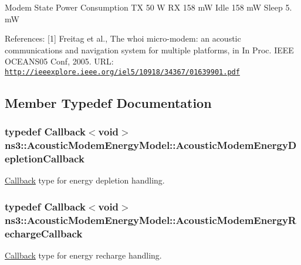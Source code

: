 Modem State Power Consumption TX 50 W RX 158 mW Idle 158 mW Sleep 5. mW

References\+: \mbox{[}1\mbox{]} Freitag et al., The whoi micro-\/modem\+: an acoustic communications and navigation system for multiple platforms, in In Proc. I\+E\+EE O\+C\+E\+A\+N\+S05 Conf, 2005. U\+RL\+: \href{http://ieeexplore.ieee.org/iel5/10918/34367/01639901.pdf}{\tt http\+://ieeexplore.\+ieee.\+org/iel5/10918/34367/01639901.\+pdf} 

\subsection{Member Typedef Documentation}
\subsubsection[{\texorpdfstring{Acoustic\+Modem\+Energy\+Depletion\+Callback}{AcousticModemEnergyDepletionCallback}}]{\setlength{\rightskip}{0pt plus 5cm}typedef {\bf Callback}$<$void$>$ {\bf ns3\+::\+Acoustic\+Modem\+Energy\+Model\+::\+Acoustic\+Modem\+Energy\+Depletion\+Callback}}\hypertarget{classns3_1_1AcousticModemEnergyModel_a04ad0c4c5ea21dc8d221761b734c317b}{}\label{classns3_1_1AcousticModemEnergyModel_a04ad0c4c5ea21dc8d221761b734c317b}
\hyperlink{classns3_1_1Callback}{Callback} type for energy depletion handling. 
\subsubsection[{\texorpdfstring{Acoustic\+Modem\+Energy\+Recharge\+Callback}{AcousticModemEnergyRechargeCallback}}]{\setlength{\rightskip}{0pt plus 5cm}typedef {\bf Callback}$<$void$>$ {\bf ns3\+::\+Acoustic\+Modem\+Energy\+Model\+::\+Acoustic\+Modem\+Energy\+Recharge\+Callback}}\hypertarget{classns3_1_1AcousticModemEnergyModel_a54a60baedb4014f67531e44ce079f1b1}{}\label{classns3_1_1AcousticModemEnergyModel_a54a60baedb4014f67531e44ce079f1b1}
\hyperlink{classns3_1_1Callback}{Callback} type for energy recharge handling. 

